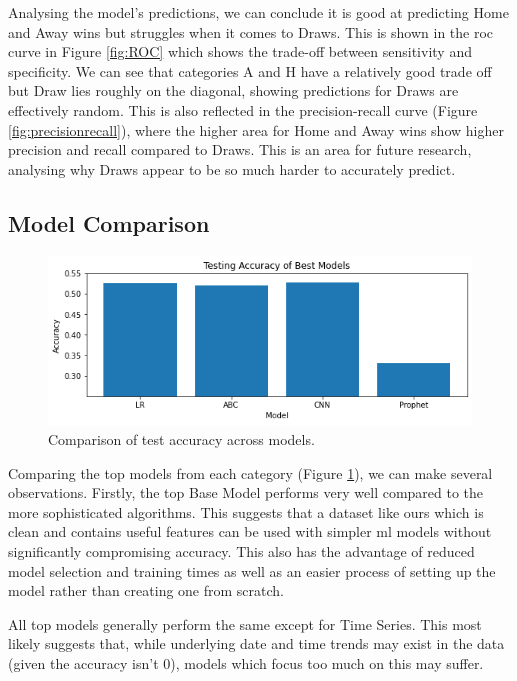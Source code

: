 \documentclass{article}
\begin{document}
Analysing the model’s predictions, we can conclude it is good at predicting Home and Away wins but struggles when it comes to Draws. This is shown in the \gls{roc} curve in Figure \ref{fig:ROC} which shows the trade-off between sensitivity and specificity. We can see that categories A and H have a relatively good trade off but Draw lies roughly on the diagonal, showing predictions for Draws are effectively random. This is also reflected in the precision-recall curve (Figure \ref{fig:precisionrecall}), where the higher area for Home and Away wins show higher precision and recall compared to Draws. This is an area for future research, analysing why Draws appear to be so much harder to accurately predict. 

\subsection{Model Comparison} 
\label{modelcomparison}

\vspace{-1em}
\begin{figure}[!htb]
    \centering
    \includegraphics[width=0.7\linewidth]{Images/Figure 6.png}
    \caption{Comparison of test accuracy across models.}
    \label{fig:models}
\end{figure}

Comparing the top models from each category (Figure \ref{fig:models}), we can make several observations. Firstly, the top Base Model performs very well compared to the more sophisticated algorithms. This suggests that a dataset like ours which is clean and contains useful features can be used with simpler \gls{ml} models without significantly compromising accuracy. This also has the advantage of reduced model selection and training times as well as an easier process of setting up the model rather than creating one from scratch.  

All top models generally perform the same except for Time Series. This most likely suggests that, while underlying date and time trends may exist in the data (given the accuracy isn’t 0), models which focus too much on this may suffer.
\end{document}
